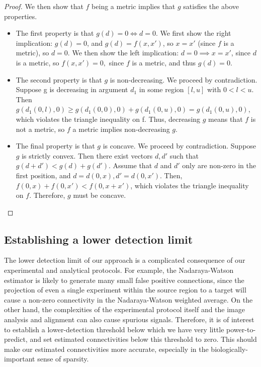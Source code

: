 \begin{proof}
We then show that $f$ being a metric implies that $g$ satisfies the above properties.
\begin{itemize}
    \item The first property is that $g(d) = 0 \Longleftrightarrow d = 0$. We first show the right implication: $g(d) = 0$, and $g(d) = f(x,x')$, so $x = x'$ (since $f$ is a metric), so $d = 0$. We then show the left implication: $d = 0 \implies x = x'$, since $d$ is a metric, so $f(x,x') = 0,$ since $f$ is a metric, and thus $g(d) = 0$.
    \item The second property is that $g$ is non-decreasing. We proceed by contradiction.
    Suppose g is decreasing in argument $d_1$ in some region $[l, u]$ with $0 < l< u$.
    Then $g(d_1(0, l), 0) \geq g(d_1(0, 0), 0) + g(d_1(0, u), 0) = g(d_1(0, u),0)$, which violates the triangle inequality on f. Thus, decreasing $g$ means that $f$ is not a metric, so $f$ a metric implies non-decreasing $g$.
    \item The final property is that $g$ is concave. We proceed by contradiction. Suppose $g$ is strictly convex. Then there exist vectors $d, d'$ such that $g(d + d')  < g(d) + g(d')$.  Assume that $d$ and $d'$ only are non-zero in the first position, and $d = d(0, x), d' = d(0,x')$.  Then, $f(0,x) + f(0,x') <  f(0,x+ x')$, which violates the triangle inequality on $f$.  Therefore, $g$ must be concave.
\end{itemize}

\end{proof}

\newpage

\subsection{Establishing a lower detection limit}
\label{supp_sec:methods_lower}

The lower detection limit of our approach is a complicated consequence of our experimental and analytical protocols.
For example, the Nadaraya-Watson estimator is likely to generate many small false positive connections, since the projection of even a single experiment within the source region to a target will cause a non-zero connectivity in the Nadaraya-Watson weighted average.
On the other hand, the complexities of the experimental protocol itself and the image analysis and alignment can also cause spurious signals.
Therefore, it is of interest to establish a lower-detection threshold below which we have very little power-to-predict, and set estimated connectivities below this threshold to zero.
This should make our estimated connectivities more accurate, especially in the biologically-important sense of sparsity.

